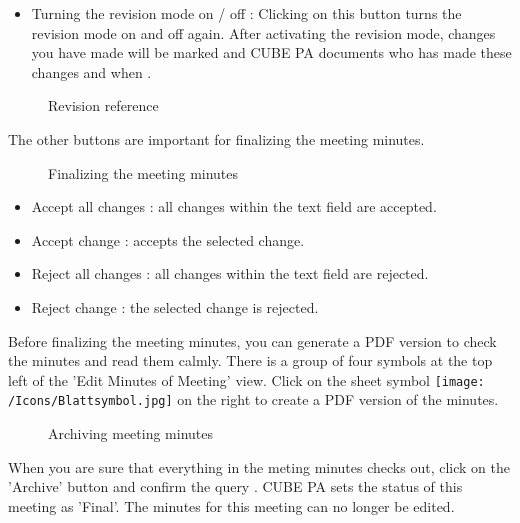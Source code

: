 \begin{itemize}
\item
Turning the revision mode on / off : Clicking on this button turns the revision mode on and off again. After activating the revision mode, changes you have made will be marked  and CUBE PA documents who has made these changes and when .
\end{itemize}

\begin{figure}[H]
\caption{Revision reference}
\end{figure}

The other buttons are important for finalizing the meeting minutes.

\begin{figure}[H]
\caption{Finalizing the meeting minutes}
\end{figure}

\begin{itemize}
\item
Accept all changes : all changes within the text field are accepted.
\item
Accept change : accepts the selected change.
\item
Reject all changes : all changes within the text field are rejected.
\item
Reject change : the selected change is rejected.
\end{itemize}

\vspace{\baselineskip}

Before finalizing the meeting minutes, you can generate a PDF version to check the minutes and read them calmly. There is a group of four symbols at the top left of the 'Edit Minutes of Meeting' view. Click on the sheet symbol \texttt{[image: /Icons/Blattsymbol.jpg]}  on the right to create a PDF version of the minutes.

\begin{figure}[H]
\caption{Archiving meeting minutes}
\end{figure}

When you are sure that everything in the meting minutes checks out, click on the 'Archive' button  and confirm the query . CUBE PA sets the status of this meeting as 'Final'. The minutes for this meeting can no longer be edited.

